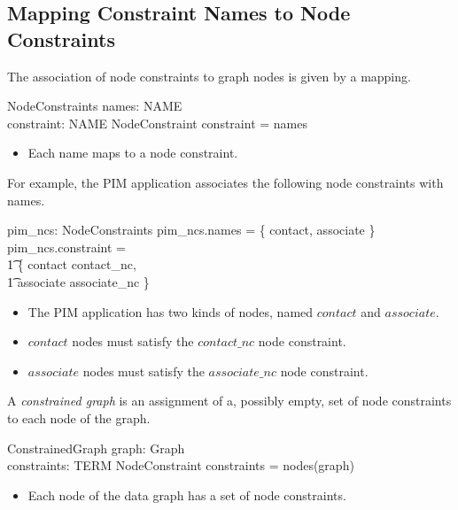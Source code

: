 \documentclass{article}
\begin{document}
\subsection{Mapping Constraint Names to Node Constraints}

The association of node constraints to graph nodes is given by a mapping.
\begin{schema}{NodeConstraints}
	names: \finset NAME \\
	constraint: NAME \pfun NodeConstraint
\where
	\dom constraint = names
\end{schema}
\begin{itemize}
\item Each name maps to a node constraint.
\end{itemize}

For example, the PIM application associates the following node constraints with names.
\begin{axdef}
	pim\_ncs: NodeConstraints
\where
	pim\_ncs.names = \{ contact, associate \}
\also
	pim\_ncs.constraint = \\
\t1		\{ contact \mapsto contact\_nc, \\
\t1		associate \mapsto associate\_nc \}
\end{axdef}
\begin{itemize}
\item The PIM application has two kinds of nodes, named $contact$ and $associate$.
\item $contact$ nodes must satisfy the $contact\_nc$ node constraint.
\item $associate$ nodes must satisfy the $associate\_nc$ node constraint.
\end{itemize}

A {\em constrained graph} is an assignment of a, possibly empty, set of node constraints to each node of the graph.
\begin{schema}{ConstrainedGraph}
	graph: Graph \\
	constraints: TERM \pfun \power NodeConstraint
\where
	\dom constraints = nodes(graph)
\end{schema}
\begin{itemize}
\item Each node of the data graph has a set of node constraints.
\end{itemize}
\end{document}
